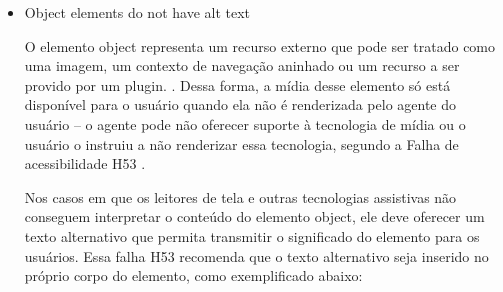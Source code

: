 \documentclass[
	12pt,				%
	openright,			%
	oneside,			%
	a4paper,			%
	chapter=TITLE,		%
	section=TITLE,		%
	subsection=TITLE,	%
	subsubsection=TITLE,%
	english,			%
	brazil				%
	]{abntex2}
\theoremstyle{definition}
\begin{document}
\begin{itemize}
Embora existam os atributos WAI-ARIA que podem ser usados para fornecer um texto alternativo, desde que sejam compatíveis com a acessibilidade, ainda é recomendado pelas Técnicas do W3C para WCAG 2.0 o atributo alt como a forma preferida de resolver essa falha de acessibidade.

\begin{figure}[!h]
\centering
\caption{Ausência do atributo alt na tag img}
\label{Ausência do atributo alt na tag img}
\end{figure}

Na figura \ref{Ausência do atributo alt na tag img} acima podemos perceber a ausência do atributo alt, aria-label ou aria-labelledby associado a algum id. Como também é um elemento conteudístico – que representa a imagem de perfil de algum usuário – é recomendado, para solucionar o problema, uma simples adição do atributo alt com um valor descritivo da imagem.


 \item Object elements do not have alt text
   
O elemento object representa um recurso externo que pode ser tratado como uma imagem, um contexto de navegação aninhado ou um recurso a ser provido por um plugin. \cite{htmldoc}. Dessa forma, a mídia desse elemento só está disponível para o usuário quando ela não é renderizada pelo agente do usuário – o agente pode não oferecer suporte à tecnologia de mídia ou o usuário o instruiu a não renderizar essa tecnologia, segundo a Falha de acessibilidade H53 \cite{cooper2010techniques}.

Nos casos em que os leitores de tela e outras tecnologias assistivas não conseguem interpretar o conteúdo do elemento object, ele deve oferecer um texto alternativo que permita transmitir o significado do elemento para os usuários. Essa falha H53 recomenda que o texto alternativo seja inserido no próprio corpo do elemento, como exemplificado abaixo:


\end{itemize}
\end{document}
